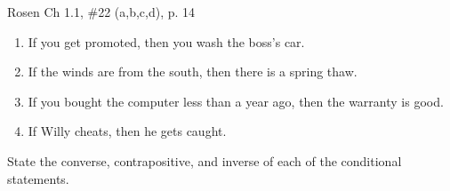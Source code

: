 \documentclass[12pt,addpoints]{exam}
\begin{document}
\begin{questions}
\question Rosen Ch 1.1, \#22 (a,b,c,d), p. 14
    \ifprintanswers
        \vspace{-15pt}
    \fi
    \begin{solution}
    \begin{enumerate}[label=(\alph*),itemsep=0pt,parsep=0pt,topsep=0pt,partopsep=0pt]
        \item If you get promoted, then you wash the boss's car.
        \item If the winds are from the south, then there is a spring thaw.
        \item If you bought the computer less than a year ago, then the warranty is good.
        \item If Willy cheats, then he gets caught.
    \end{enumerate}
    \end{solution}

\question State the converse, contrapositive, and inverse of each of the conditional statements.
    \begin{parts}

\end{parts}
\end{questions}
\end{document}
